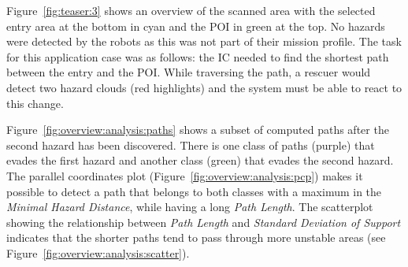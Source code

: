 \documentclass{egpubl}
\begin{document}
Figure~\ref{fig:teaser:3} shows an overview of the scanned area with the selected entry area at the bottom in cyan and the POI in green at the top. No hazards were detected by the robots as this was not part of their mission profile. The task for this application case was as follows: the IC needed to find the shortest path between the entry and the POI. While traversing the path, a rescuer would detect two hazard clouds (red highlights) and the system must be able to react to this change.

Figure~\ref{fig:overview:analysis:paths} shows a subset of computed paths after the second hazard has been discovered. There is one class of paths (purple) that evades the first hazard and another class (green) that evades the second hazard. The parallel coordinates plot (Figure~\ref{fig:overview:analysis:pcp}) makes it possible to detect a path that belongs to both classes with a maximum in the \emph{Minimal Hazard Distance}, while having a long \emph{Path Length}. The scatterplot showing the relationship between \emph{Path Length} and \emph{Standard Deviation of Support} indicates that the shorter paths tend to pass through more unstable areas (see Figure~\ref{fig:overview:analysis:scatter}).

\end{document}
